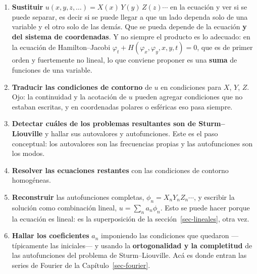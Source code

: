 \documentclass[
  spanish,
  a4paper,
]{scrbook}
\providecommand{\tightlist}{%
  \setlength{\itemsep}{0pt}\setlength{\parskip}{0pt}}
\theoremstyle{definition}
\theoremstyle{plain}
\theoremstyle{definition}
\theoremstyle{plain}
\theoremstyle{definition}
\theoremstyle{remark}
\begin{document}
\begin{enumerate}
\def\labelenumi{\arabic{enumi}.}
\tightlist
\item
  \textbf{Sustituir} \(u(x,y,z,\dots) = X(x)\,Y(y)\,Z(z)\cdots\) en la
  ecuación y ver si se puede separar, es decir si se puede llegar a que
  un lado dependa solo de una variable y el otro solo de las demás. Que
  se pueda depende de la ecuación \textbf{y del sistema de coordenadas}.
  Y no siempre el producto es lo adecuado: en la ecuación de
  Hamilton--Jacobi \(\varphi_t + H(\varphi_x,\varphi_y,x,y,t) = 0\), que
  es de primer orden y fuertemente no lineal, lo que conviene proponer
  es una \textbf{suma} de funciones de una variable.
\item
  \textbf{Traducir las condiciones de contorno} de \(u\) en condiciones
  para \(X\), \(Y\), \(Z\). Ojo: la continuidad y la acotación de \(u\)
  pueden agregar condiciones que no estaban escritas, y en coordenadas
  polares o esféricas eso pasa siempre.
\item
  \textbf{Detectar cuáles de los problemas resultantes son de
  Sturm--Liouville} y hallar sus autovalores y autofunciones. Este es el
  paso conceptual: los autovalores son las frecuencias propias y las
  autofunciones son los modos.
\item
  \textbf{Resolver las ecuaciones restantes} con las condiciones de
  contorno homogéneas.
\item
  \textbf{Reconstruir} las autofunciones completas,
  \(\phi_n = X_nY_nZ_n\cdots\), y escribir la solución como combinación
  lineal, \(u = \sum_n a_n\phi_n\). Esto se puede hacer porque la
  ecuación es lineal: es la superposición de la
  sección~\ref{sec-lineales}, otra vez.
\item
  \textbf{Hallar los coeficientes} \(a_n\) imponiendo las condiciones
  que quedaron ---típicamente las iniciales--- y usando la
  \textbf{ortogonalidad y la completitud} de las autofunciones del
  problema de Sturm--Liouville. Acá es donde entran las series de
  Fourier de la Capítulo~\ref{sec-fourier}.
\end{enumerate}
\end{document}
